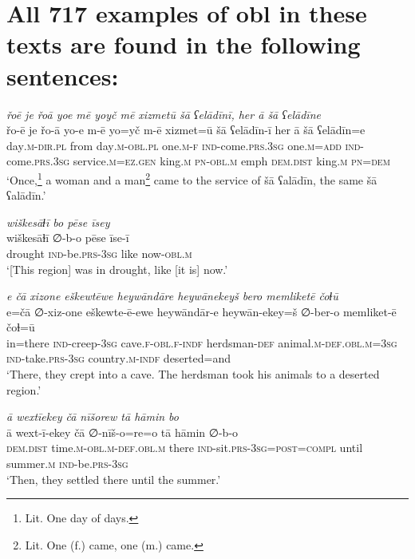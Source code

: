 \chapter{All 717 examples of obl in these texts are found in the following sentences:}

\ea \label{ZB.1}
\textit{řoē je řoā yoe mē yoyč mē xizmetū šā ʕelādīnī, her ā šā ʕelādīne} \\ 
\gll řo-ē je řo-ā yo-e m-ē yo=yč m-ē xizmet=ū šā ʕelādīn-ī her ā šā ʕelādīn=e \\ 
 day\textsc{.m}\textsc{-dir}\textsc{.pl} from day\textsc{.m}\textsc{-obl}\textsc{.pl} one\textsc{.m}\textsc{-f} \textsc{ind-}come\textsc{.prs}\textsc{.3sg} one\textsc{.m}\textsc{=add} \textsc{ind-}come\textsc{.prs}\textsc{.3sg} service\textsc{.m}\textsc{\textsc{=ez.gen}} king\textsc{.m} \textsc{pn}\textsc{-obl}\textsc{.m} emph \textsc{dem.dist} king\textsc{.m} \textsc{pn}\textsc{=dem} \\ 
\glt `Once,\footnote{Lit. One day of days.} a woman and a man\footnote{Lit. One (f.) came, one (m.) came.} came to the service of šā ʕalādīn, the same šā ʕalādīn.'
\z 
 
\ea \label{ZB.2}
\textit{wiškesāɫī bo pēse īsey} \\ 
\gll wiškesāɫī ∅-b-o pēse īse-ī \\ 
 drought \textsc{ind-}be\textsc{.prs}\textsc{-3sg} like now\textsc{-obl}\textsc{.m} \\ 
\glt `[This region] was in drought, like [it is] now.'
\z 
 
\ea \label{ZB.5}
\textit{e čā xizone eškewtēwe heywāndāre heywānekeyš bero memliketē čoɫū} \\ 
\gll e=čā ∅-xiz-one eškewte-ē-ewe heywāndār-e heywān-ekey=š ∅-ber-o memliket-ē čoɫ=ū \\ 
 in=there \textsc{ind-}creep\textsc{-3sg} cave\textsc{.f}\textsc{-obl}\textsc{.f}\textsc{-indf} herdsman\textsc{-def} animal\textsc{.m}\textsc{-def}\textsc{.obl}\textsc{.m}\textsc{=3sg} \textsc{ind-}take\textsc{.prs}\textsc{-3sg} country\textsc{.m}\textsc{-indf} deserted=and \\ 
\glt `There, they crept into a cave. The herdsman took his animals to a deserted region.'
\z 
 
\ea \label{ZB.6}
\textit{ā wextīekey čā nīšorew tā hāmin bo} \\ 
\gll ā wext-ī-ekey čā ∅-nīš-o=re=o tā hāmin ∅-b-o \\ 
 \textsc{dem.dist} time\textsc{.m}\textsc{-obl}\textsc{.m}\textsc{-def}\textsc{.obl}\textsc{.m} there \textsc{ind-}sit\textsc{.prs}\textsc{-3sg}\textsc{=\textsc{post}}\textsc{=compl} until summer\textsc{.m} \textsc{ind-}be\textsc{.prs}\textsc{-3sg} \\ 
\glt `Then, they settled there until the summer.'
\z 
 
